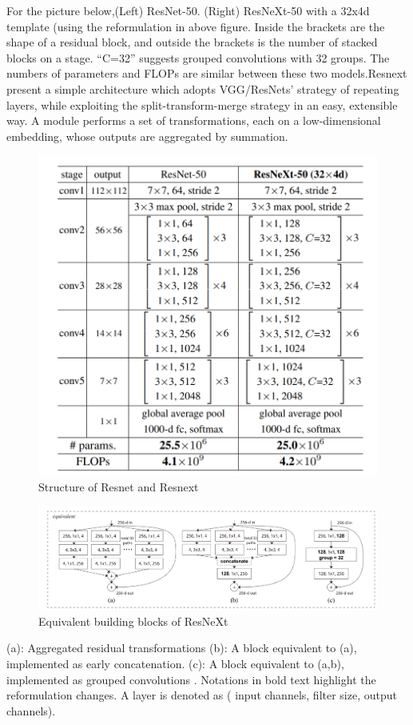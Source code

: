 For the picture below,(Left) ResNet-50. (Right) ResNeXt-50 with a 32x4d
template (using the reformulation in above figure. Inside the brackets
are the shape of a residual block, and outside the brackets is the
number of stacked blocks on a stage. “C=32” suggests grouped
convolutions with 32 groups. The numbers of parameters and
FLOPs are similar between these two models.Resnext present a simple architecture which
adopts VGG/ResNets’ strategy of repeating layers, while
exploiting the split-transform-merge strategy in an easy, extensible way. A module  performs a set
of transformations, each on a low-dimensional embedding,
whose outputs are aggregated by summation.
\begin{figure}[H]
  \centering
  \includegraphics[width=\linewidth]{figs/structure.png}
  \caption{Structure of Resnet and Resnext}
  \label{fig:example}
\end{figure}




\begin{figure}[H]
  \centering
  \includegraphics[width=\linewidth]{figs/equivalent.png}
  \caption{Equivalent building blocks of ResNeXt}
  \label{fig:example}
\end{figure}
(a): Aggregated residual transformations (b): A block equivalent
to (a), implemented as early concatenation. (c): A block equivalent to (a,b), implemented as grouped convolutions . Notations in bold
text highlight the reformulation changes. A layer is denoted as ( input channels, filter size,  output channels).

